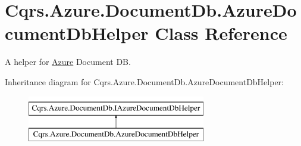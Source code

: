 \hypertarget{classCqrs_1_1Azure_1_1DocumentDb_1_1AzureDocumentDbHelper}{}\section{Cqrs.\+Azure.\+Document\+Db.\+Azure\+Document\+Db\+Helper Class Reference}
\label{classCqrs_1_1Azure_1_1DocumentDb_1_1AzureDocumentDbHelper}


A helper for \hyperlink{namespaceCqrs_1_1Azure}{Azure} Document DB.  


Inheritance diagram for Cqrs.\+Azure.\+Document\+Db.\+Azure\+Document\+Db\+Helper\+:\begin{figure}[H]
\begin{center}
\leavevmode
\includegraphics[height=2.000000cm]{classCqrs_1_1Azure_1_1DocumentDb_1_1AzureDocumentDbHelper}
\end{center}
\end{figure}
